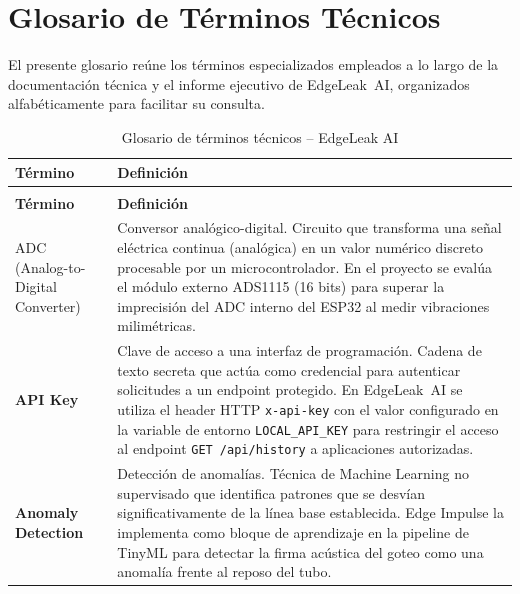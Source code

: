 \documentclass[12pt,a4paper]{article}
\begin{document}
\newpage

\section{Glosario de Términos Técnicos}

El presente glosario reúne los términos especializados empleados a lo largo de la
documentación técnica y el informe ejecutivo de EdgeLeak~AI, organizados alfabéticamente
para facilitar su consulta.

\begin{longtable}{>{\bfseries}p{3.8cm} p{10.5cm}}
\caption{Glosario de términos técnicos -- EdgeLeak AI} \label{tab:glosario} \\
\toprule
\textbf{Término} & \textbf{Definición} \\
\midrule
\endfirsthead
\multicolumn{2}{c}{\small\textit{(continúa en la siguiente página)}} \\
\toprule
\textbf{Término} & \textbf{Definición} \\
\midrule
\endhead
\bottomrule
\endlastfoot

ADC (Analog-to-Digital Converter) & Conversor analógico-digital. Circuito que transforma
una señal eléctrica continua (analógica) en un valor numérico discreto procesable por un
microcontrolador. En el proyecto se evalúa el módulo externo ADS1115 (16 bits) para
superar la imprecisión del ADC interno del ESP32 al medir vibraciones milimétricas.
\\[0.5em]

API Key & Clave de acceso a una interfaz de programación. Cadena de texto secreta que
actúa como credencial para autenticar solicitudes a un endpoint protegido. En EdgeLeak~AI
se utiliza el header HTTP \texttt{x-api-key} con el valor configurado en la variable de
entorno \texttt{LOCAL\_API\_KEY} para restringir el acceso al endpoint
\texttt{GET /api/history} a aplicaciones autorizadas.
\\[0.5em]

Anomaly Detection & Detección de anomalías. Técnica de Machine Learning no supervisado
que identifica patrones que se desvían significativamente de la línea base establecida.
Edge Impulse la implementa como bloque de aprendizaje en la pipeline de TinyML para
detectar la firma acústica del goteo como una anomalía frente al reposo del tubo.
\\[0.5em]


\end{longtable}
\end{document}
